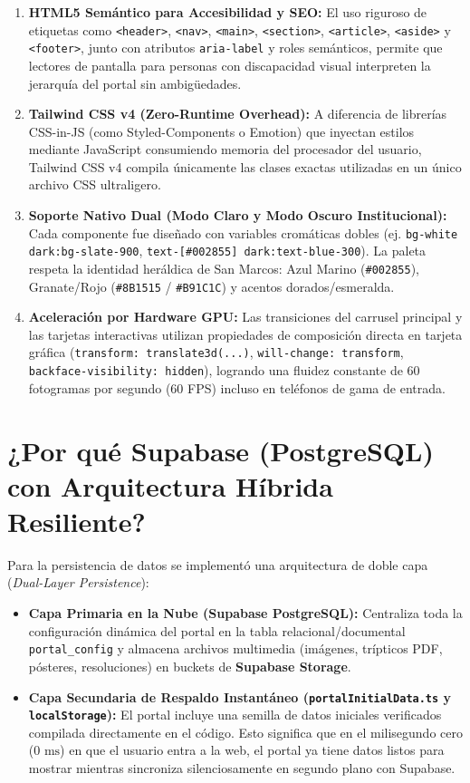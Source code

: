 \documentclass[12pt,a4paper,oneside]{report}
\begin{document}
\begin{enumerate}[label=\textbf{\arabic*.}, leftmargin=1.1cm]
  \item \textbf{HTML5 Semántico para Accesibilidad y SEO:} El uso riguroso de etiquetas como \texttt{<header>}, \texttt{<nav>}, \texttt{<main>}, \texttt{<section>}, \texttt{<article>}, \texttt{<aside>} y \texttt{<footer>}, junto con atributos \texttt{aria-label} y roles semánticos, permite que lectores de pantalla para personas con discapacidad visual interpreten la jerarquía del portal sin ambigüedades.
  \item \textbf{Tailwind CSS v4 (Zero-Runtime Overhead):} A diferencia de librerías CSS-in-JS (como Styled-Components o Emotion) que inyectan estilos mediante JavaScript consumiendo memoria del procesador del usuario, Tailwind CSS v4 compila únicamente las clases exactas utilizadas en un único archivo CSS ultraligero.
  \item \textbf{Soporte Nativo Dual (Modo Claro y Modo Oscuro Institucional):} Cada componente fue diseñado con variables cromáticas dobles (ej. \texttt{bg-white dark:bg-slate-900}, \texttt{text-[\#002855] dark:text-blue-300}). La paleta respeta la identidad heráldica de San Marcos: Azul Marino (\texttt{\#002855}), Granate/Rojo (\texttt{\#8B1515} / \texttt{\#B91C1C}) y acentos dorados/esmeralda.
  \item \textbf{Aceleración por Hardware GPU:} Las transiciones del carrusel principal y las tarjetas interactivas utilizan propiedades de composición directa en tarjeta gráfica (\texttt{transform: translate3d(...)}, \texttt{will-change: transform}, \texttt{backface-visibility: hidden}), logrando una fluidez constante de 60 fotogramas por segundo (60 FPS) incluso en teléfonos de gama de entrada.
\end{enumerate}

\section{¿Por qué Supabase (PostgreSQL) con Arquitectura Híbrida Resiliente?}
Para la persistencia de datos se implementó una arquitectura de doble capa (\textit{Dual-Layer Persistence}):
\begin{itemize}[leftmargin=1.0cm]
  \item \textbf{Capa Primaria en la Nube (Supabase PostgreSQL):} Centraliza toda la configuración dinámica del portal en la tabla relacional/documental \texttt{portal\_config} y almacena archivos multimedia (imágenes, trípticos PDF, pósteres, resoluciones) en buckets de \textbf{Supabase Storage}.
  \item \textbf{Capa Secundaria de Respaldo Instantáneo (\texttt{portalInitialData.ts} y \texttt{localStorage}):} El portal incluye una semilla de datos iniciales verificados compilada directamente en el código. Esto significa que en el milisegundo cero ($0\text{ ms}$) en que el usuario entra a la web, el portal ya tiene datos listos para mostrar mientras sincroniza silenciosamente en segundo plano con Supabase.
\end{itemize}
\end{document}
